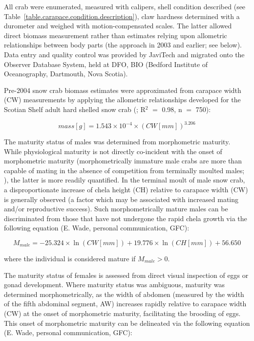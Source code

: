 \documentclass[11pt]{article}
\begin{document}
All crab were enumerated, measured with calipers, shell condition described (see Table~\ref{table.carapace.condition.description}), claw hardness determined with a durometer and weighed with motion-compensated scales. The latter allowed direct biomass measurement rather than estimates relying upon allometric relationships between body parts (the approach in 2003 and earlier; see below). Data entry and quality control was provided by JaviTech and migrated onto the Observer Database System, held at DFO, BIO (Bedford Institute of Oceanography, Dartmouth, Nova Scotia).

Pre-2004 snow crab biomass estimates were approximated from carapace width (CW) measurements by applying the allometric relationships developed for the Scotian Shelf adult hard shelled snow crab (\citealt{Biron1999}; R$^{2}$ $=$ 0.98, n $=$ 750):

\begin{equation}
  mass [g] = 1.543 \times 10^{-4} \times {(CW [mm])}^{3.206}
\end{equation}

The maturity status of males was determined from morphometric maturity. While physiological maturity is not directly co-incident with the onset of morphometric maturity (morphometrically immature male crabs are more than capable of mating in the absence of competition from terminally moulted males;  \citealt{Sainte-Marie1993}), the latter is more readily quantified. In the terminal moult of male snow crab, a disproportionate increase of chela height (CH) relative to carapace width (CW) is generally observed (a factor which may be associated with increased mating and/or reproductive success). Such morphometrically mature males can be discriminated from those that have not undergone the rapid chela growth via the following equation (E. Wade, personal communication, GFC):

\begin{equation}
  M_{male} = -25.324 \times \ln(CW [mm]) + 19.776 \times \ln(CH [mm]) + 56.650
\end{equation}

where the individual is considered mature if $M_{male} > 0$.

The maturity status of females is assessed from direct visual inspection of eggs or gonad development. Where maturity status was ambiguous, maturity was determined morphometrically, as the width of abdomen (measured by the width of the fifth abdominal segment, AW) increases rapidly relative to carapace width (CW) at the onset of morphometric maturity, facilitating the brooding of eggs. This onset of morphometric maturity can be delineated via the following equation (E. Wade, personal communication, GFC):
\end{document}
